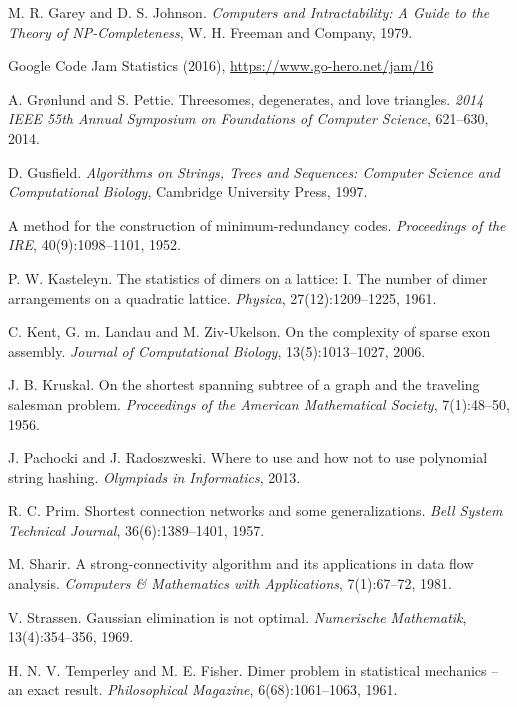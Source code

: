 \begin{thebibliography}{9}
  M. R. Garey and D. S. Johnson.
  \emph{Computers and Intractability:
  A Guide to the Theory of NP-Completeness},
  W. H. Freeman and Company, 1979.

  Google Code Jam Statistics (2016),
  \url{https://www.go-hero.net/jam/16}

  A. Grønlund and S. Pettie.
  Threesomes, degenerates, and love triangles.
  \emph{2014 IEEE 55th Annual Symposium on Foundations of Computer Science},
  621--630, 2014.

  D. Gusfield.
  \emph{Algorithms on Strings, Trees and Sequences:
  Computer Science and Computational Biology},
  Cambridge University Press, 1997.

  A method for the construction of minimum-redundancy codes.
  \emph{Proceedings of the IRE}, 40(9):1098--1101, 1952.

  P. W. Kasteleyn.  
  The statistics of dimers on a lattice: I. The number of dimer arrangements on a quadratic lattice.
  \emph{Physica}, 27(12):1209--1225, 1961.

  C. Kent, G. m. Landau and M. Ziv-Ukelson.
  On the complexity of sparse exon assembly.
  \emph{Journal of Computational Biology}, 13(5):1013--1027, 2006.

  J. B. Kruskal.
  On the shortest spanning subtree of a graph and the traveling salesman problem.
  \emph{Proceedings of the American Mathematical Society}, 7(1):48--50, 1956.

  J. Pachocki and J. Radoszweski.
  Where to use and how not to use polynomial string hashing.
  \emph{Olympiads in Informatics}, 2013.

  R. C. Prim.
  Shortest connection networks and some generalizations.
  \emph{Bell System Technical Journal}, 36(6):1389--1401, 1957.

  M. Sharir.
  A strong-connectivity algorithm and its applications in data flow analysis.
  \emph{Computers \& Mathematics with Applications}, 7(1):67--72, 1981.

  V. Strassen.
  Gaussian elimination is not optimal.
  \emph{Numerische Mathematik}, 13(4):354--356, 1969.

  H. N. V. Temperley and M. E. Fisher.
  Dimer problem in statistical mechanics -- an exact result.
  \emph{Philosophical Magazine}, 6(68):1061--1063, 1961.

\end{thebibliography}
